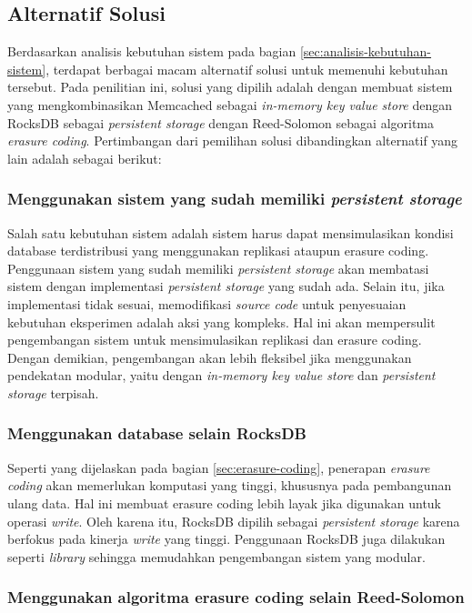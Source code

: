 \subsection{Alternatif Solusi}
\label{sec:alternatif-solusi}

Berdasarkan analisis kebutuhan sistem pada bagian \ref{sec:analisis-kebutuhan-sistem}, terdapat berbagai macam alternatif solusi untuk memenuhi kebutuhan tersebut. Pada penilitian ini, solusi yang dipilih adalah dengan membuat sistem yang mengkombinasikan Memcached sebagai \textit{in-memory key value store} dengan RocksDB sebagai \textit{persistent storage} dengan Reed-Solomon sebagai algoritma \textit{erasure coding}. Pertimbangan dari pemilihan solusi dibandingkan alternatif yang lain adalah sebagai berikut:

\subsubsection{Menggunakan sistem yang sudah memiliki \textit{persistent storage}}
Salah satu kebutuhan sistem adalah sistem harus dapat mensimulasikan kondisi database terdistribusi yang menggunakan replikasi ataupun erasure coding. Penggunaan sistem yang sudah memiliki \textit{persistent storage} akan membatasi sistem dengan implementasi \textit{persistent storage} yang sudah ada. Selain itu, jika implementasi tidak sesuai, memodifikasi \textit{source code} untuk penyesuaian kebutuhan eksperimen adalah aksi yang kompleks. Hal ini akan mempersulit pengembangan sistem untuk mensimulasikan replikasi dan erasure coding. Dengan demikian, pengembangan akan lebih fleksibel jika menggunakan pendekatan modular, yaitu dengan \textit{in-memory key value store} dan \textit{persistent storage} terpisah.

\subsubsection{Menggunakan database selain RocksDB}
Seperti yang dijelaskan pada bagian \ref{sec:erasure-coding}, penerapan \textit{erasure coding} akan memerlukan komputasi yang tinggi, khususnya pada pembangunan ulang data. Hal ini membuat erasure coding lebih layak jika digunakan untuk operasi \textit{write}. Oleh karena itu, RocksDB dipilih sebagai \textit{persistent storage} karena berfokus pada kinerja \textit{write} yang tinggi. Penggunaan RocksDB juga dilakukan seperti \textit{library} sehingga memudahkan pengembangan sistem yang modular. 

\subsubsection{Menggunakan algoritma erasure coding selain Reed-Solomon}


